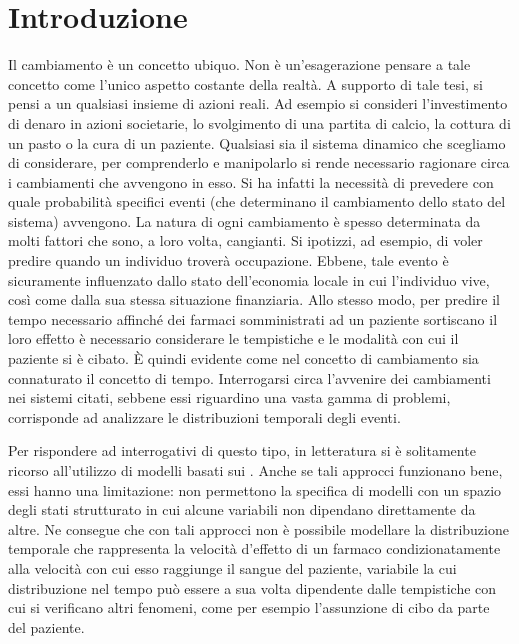 
\cleardoublepage
{}
\chapter*{Introduzione}\label{cap:intro}
Il cambiamento è un concetto ubiquo.
Non è un'esagerazione pensare a tale concetto come l'unico aspetto costante della realtà.
A supporto di tale tesi, si pensi a un qualsiasi insieme di azioni reali.
Ad esempio si consideri l'investimento di denaro in azioni societarie, lo svolgimento di una partita di calcio, la cottura di un pasto o la cura di un paziente.
Qualsiasi sia il sistema dinamico che scegliamo di considerare, per comprenderlo e manipolarlo si rende necessario ragionare circa i cambiamenti che avvengono in esso.
Si ha infatti la necessità di prevedere con quale probabilità specifici eventi (che determinano il cambiamento dello stato del sistema) avvengono.
La natura di ogni cambiamento è spesso determinata da molti fattori che sono, a loro volta, cangianti.
Si ipotizzi, ad esempio, di voler predire quando un individuo troverà occupazione.
Ebbene, tale evento è sicuramente influenzato dallo stato dell'economia locale in cui l'individuo vive, così come dalla sua stessa situazione finanziaria.
Allo stesso modo, per predire il tempo necessario affinché dei farmaci somministrati ad un paziente sortiscano il loro effetto è necessario considerare le tempistiche e le modalità con cui il paziente si è cibato.
\`E quindi evidente come nel concetto di cambiamento sia connaturato il concetto di tempo.
Interrogarsi circa l'avvenire dei cambiamenti nei sistemi citati, sebbene essi riguardino una vasta gamma di problemi, corrisponde ad analizzare le distribuzioni temporali degli eventi.

Per rispondere ad interrogativi di questo tipo, in letteratura si è solitamente ricorso all'utilizzo di modelli basati sui \mprocess{}
\citep{Duffie1996,Lando1998}.
Anche se tali approcci funzionano bene, essi hanno una limitazione: non permettono la specifica di modelli con un spazio degli stati strutturato in cui alcune variabili non dipendano direttamente da altre. Ne consegue che con tali approcci non è possibile modellare la distribuzione temporale che rappresenta la velocità d'effetto di un farmaco condizionatamente alla velocità con cui esso raggiunge il sangue del paziente, variabile la cui distribuzione nel tempo può essere a sua volta dipendente dalle tempistiche con cui si verificano altri fenomeni, come per esempio l'assunzione di cibo da parte del paziente.

